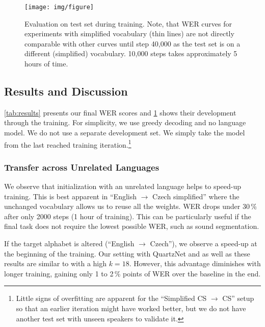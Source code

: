 \begin{landscape}
	\begin{figure}[t]
		\texttt{[image: img/figure]}
		\caption{Evaluation on test set during training. %
			Note, that WER curves for experiments with simplified vocabulary (thin lines) are not directly comparable with other curves until step 40,000 as the test set is on a different (simplified) vocabulary. 10,000 steps takes approximately 5 hours of time.}
		\label{fig:training}
	\end{figure}
\end{landscape}

\subsection{Results and Discussion}
\label{sec:results}


\cref{tab:results} presents our final WER scores and \cref{fig:training} shows their development through the training. For simplicity, we use greedy decoding and no language model. We do not use a separate development set. We simply take the model from the last reached training iteration.\footnote{Little signs of overfitting are apparent for the ``Simplified CS $\rightarrow$ CS'' setup so that an earlier iteration might have worked better, but we do not have another test set with unseen speakers to validate it.}

\subsubsection{Transfer across Unrelated Languages}

We observe that initialization %
with an unrelated language helps to speed-up training. This is best apparent in ``English $\rightarrow$ Czech simplified'' where the unchanged vocabulary allows us to reuse all the weights. WER drops under 30\,\%  after only 2000 steps (1 hour of training). This can be particularly useful if the final task does not require the lowest possible WER, such as sound segmentation.


If the target alphabet is altered (``English $\rightarrow$ Czech''), we observe a speed-up at the beginning of the training. Our setting with QuartzNet and as well as these results are similar to  with a high $k = 18$. %
However, this advantage diminishes with longer training, gaining only
1 to 2\,\% points of WER over the baseline in the end.

